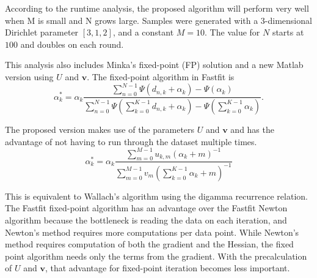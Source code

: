 \documentclass[twoside]{article}
\begin{document}
According to the runtime analysis, the proposed algorithm will perform very well when M is small and N grows large.  Samples were generated with a 3-dimensional Dirichlet parameter $[3,1,2]$, and a constant $M = 10$.  The value for $N$ starts at $100$ and doubles on each round.

This analysis also includes Minka's fixed-point (FP) solution and a new Matlab version using $U$ and $\mathbf{v}$.  The fixed-point algorithm in Fastfit is
\[
\alpha_k^{*}= \alpha_k\frac{\sum_{n=0}^{N-1}\Psi(d_{n,k}+\alpha_k)-\Psi(\alpha_k)}{\sum_{n=0}^{N-1}\Psi(\sum_{k=0}^{K-1}d_{n,k}+\alpha_k)-\Psi(\sum_{k=0}^{K-1}\alpha_k)}.
\]

The proposed version makes use of the parameters $U$ and $\mathbf{v}$ and has the advantage of not having to run through the dataset multiple times.
\[
\alpha_k^{*}= \alpha_k\frac{\sum_{m=0}^{M-1}u_{k,m}(\alpha_k+m)^{-1}}{\sum_{m=0}^{M-1}v_m\left(\sum_{k=0}^{K-1}\alpha_k+m\right)^{-1}}
\]

This is equivalent to Wallach's algorithm using the digamma recurrence relation\cite{wallach}. The Fastfit fixed-point algorithm has an advantage over the Fastfit Newton algorithm because the bottleneck is reading the data on each iteration, and Newton's method requires more computations per data point.  While Newton's method requires computation of both the gradient and the Hessian, the fixed point algorithm needs only the terms from the gradient.  With the precalculation of $U$ and $\mathbf{v}$, that advantage for fixed-point iteration becomes less important.
\end{document}
